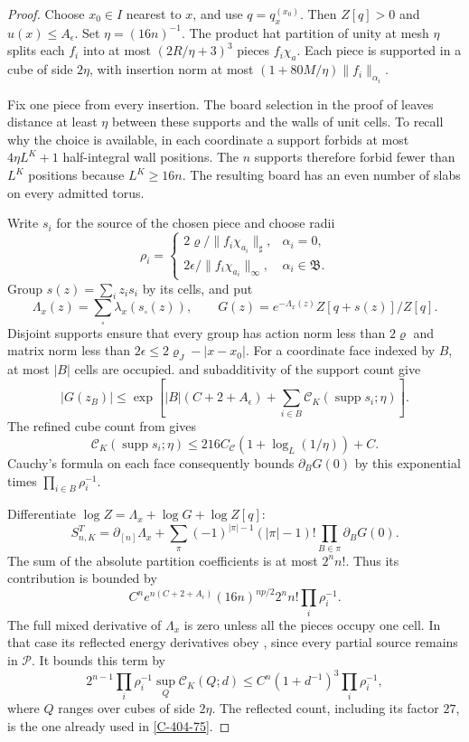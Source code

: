 \documentclass[11pt,letterpaper,reqno]{amsart}
\theoremstyle{definition}
\theoremstyle{remark}
\begin{document}
\begin{proof}
Choose \(x_0\in I\) nearest to \(x\), and use
\(q=q_x^{(x_0)}\). Then \(Z[q]>0\) and \(u(x)\le A_\epsilon\).
Set \(\eta=(16n)^{-1}\). The product hat partition of unity
at mesh \(\eta\) splits each \(f_i\) into at most
\((2R/\eta+3)^3\) pieces \(f_i\chi_a\).
Each piece is supported in a cube of side \(2\eta\), with
insertion norm at most
\((1+80M/\eta)\|f_i\|_{\alpha_i}\).

Fix one piece from every insertion. The board selection in
the proof of \cite[Thm. F]{QCDM1} leaves distance at least \(\eta\) between these
supports and the walls of unit cells. To recall why the
choice is available, in each coordinate a support forbids
at most \(4\eta L^K+1\) half-integral wall positions.
The \(n\) supports therefore forbid fewer than \(L^K\)
positions because \(L^K\ge16n\).
The resulting board has an even number of slabs on every
admitted torus.

Write \(s_i\) for the source of the chosen piece and choose
radii
\[
 \rho_i=
 \begin{cases}
 2\varrho/\|f_i\chi_{a_i}\|_\sharp,&\alpha_i=0,\\
 2\epsilon/\|f_i\chi_{a_i}\|_\infty,&\alpha_i\in\mathfrak B.
 \end{cases}
\]
Group \(s(z)=\sum_i z_is_i\) by its cells, and put
\[
 \Lambda_x(z)=\sum_\square\lambda_x(s_\square(z)),\qquad
 G(z)=e^{-\Lambda_x(z)}Z[q+s(z)]/Z[q].
\]
Disjoint supports ensure that every group has action norm
less than \(2\varrho\) and matrix norm less than
\(2\epsilon\le2\varrho_J-|x-x_0|\).
For a coordinate face indexed by \(B\), at most \(|B|\)
cells are occupied.  and subadditivity of
the support count give
\[
 |G(z_B)|\le
 \exp\left[|B|(C+2+A_\epsilon)
               +\sum_{i\in B}\mathscr C_K(\operatorname{supp}s_i;\eta)\right].
\]
The refined cube count from \cite[proof of Thm. F]{QCDM1} gives
\[
 \mathscr C_K(\operatorname{supp}s_i;\eta)
       \le216C_{\mathscr C}(1+\log_L(1/\eta))+C.
\]
Cauchy's formula on each face consequently bounds
\(\partial_BG(0)\) by this exponential times
\(\prod_{i\in B}\rho_i^{-1}\).

Differentiate \(\log Z=\Lambda_x+\log G+\log Z[q]\):
\[
 S^T_{n,K}
   =\partial_{[n]}\Lambda_x+
     \sum_\pi(-1)^{|\pi|-1}(|\pi|-1)!
                           \prod_{B\in\pi}\partial_BG(0).
\]
The sum of the absolute partition coefficients is at most
\(2^nn!\). Thus its contribution is bounded by
\[
 C^ne^{n(C+2+A_\epsilon)}
        (16n)^{np/2}2^nn!\prod_i\rho_i^{-1}.
\]
The full mixed derivative of \(\Lambda_x\) is zero unless
all the pieces occupy one cell. In that case its reflected
energy derivatives obey \cite[Prop. 10.18(i)]{QCDM1}, since every partial source remains in
\(\mathcal P\). It bounds this term by
\[
 2^{n-1}\prod_i\rho_i^{-1}
       \sup_Q\mathscr C_K(Q;d)
 \le C^n(1+d^{-1})^3\prod_i\rho_i^{-1},
\]
where \(Q\) ranges over cubes of side \(2\eta\).
The reflected count, including its factor \(27\), is the
one already used in \cref{C-404-75}.


\end{proof}
\end{document}
